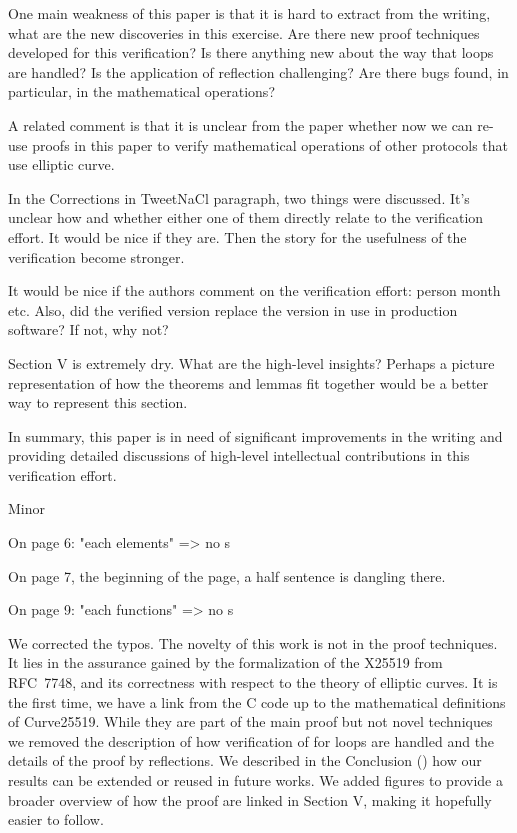 One main weakness of this paper is that it is hard to extract from the writing,
what are the new discoveries in this exercise. Are there new proof techniques
developed for this verification? Is there anything new about the way that loops
are handled? Is the application of reflection challenging? Are there bugs found,
in particular, in the mathematical operations?

A related comment is that it is unclear from the paper whether now we can re-use
proofs in this paper to verify  mathematical operations of other protocols that
use elliptic curve.

In the Corrections in TweetNaCl paragraph, two things were discussed. It's
unclear how and whether either one of them directly relate to the verification
effort. It would be nice if they are. Then the story for the usefulness of the
verification become stronger.

It would be nice if the authors comment on the verification effort: person month
etc. Also, did the verified version replace the version in use in production
software? If not, why not?

Section V is extremely dry. What are the high-level insights? Perhaps a picture
representation of how the theorems and lemmas fit together would be a better way
to represent this section.

In summary, this paper is in need of significant improvements in the writing and
providing detailed discussions of high-level intellectual contributions in this
verification effort.

Minor

On page 6: "each elements" => no s

On page 7, the beginning of the page, a half sentence is
dangling there.

On page 9: "each functions" => no s


We corrected the typos.
The novelty of this work is not in the proof techniques.
It lies in the assurance gained by the formalization of the X25519 from RFC~7748,
and its correctness with respect to the theory of elliptic curves.
It is the first time, we have a link from the C code up to the mathematical
definitions of Curve25519.
While they are part of the main proof but not novel techniques we removed the
description of how verification of for loops are handled and the details of the
proof by reflections.
We described in the Conclusion () how our results can be
extended or reused in future works.
We added figures to provide a broader overview of how the proof are linked in
Section V, making it hopefully easier to follow.


